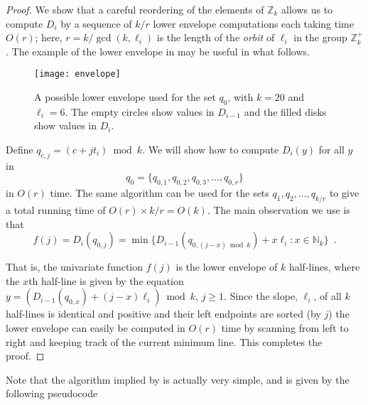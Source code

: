 \documentclass[11pt,a4paper]{article}
\newcommand{\Z}{\mathbb{Z}}
\newcommand{\N}{\mathbb{N}}
\newcommand{\defeq}{=}
\begin{document}
\begin{proof}
We show that a careful reordering of the elements of $\Z_k$ allows us
to compute $D_i$ by a sequence of $k/r$ lower envelope computations
each taking time $O(r)$; here, $r=k/\gcd(k,\ell_i)$ is the length of
the \emph{orbit} of $\ell_i$ in the group $\mathbb{Z}_k^+$.  The
example of 
the lower envelope in
 may be useful in what follows.

\begin{figure}
\begin{center}
\texttt{[image: envelope]}
\end{center}
\caption{A possible lower envelope used for the set $q_{0}$, with $k=20$
and $\ell_i=6$.   The empty circles show values in $D_{i-1}$ and
the filled disks show values in $D_i$.}
\end{figure}

Define $q_{c,j} = (c + jt_i)\bmod k$.  We will show how to compute
$D_{i}(y)$ for all $y$ in 
\[ 
    q_{0}=\{q_{0,1}, q_{0,2},q_{0,3},\ldots,q_{0,r}\}
\]
in $O(r)$ time.  The same algorithm can be used for the sets $q_{1},
q_{2}, \ldots, q_{k/r}$ to give a total running time of
$O(r)\times k/r= O(k)$.
The main observation we use is that
\begin{equation}
    f(j) \defeq D_{i}(q_{0,j}) = \min\{D_{i-1}(q_{0,(j-x)\bmod k})+x\ell_i :
x\in \N_k\} \enspace .
\end{equation}

That is, the univariate function $f(j)$ is the lower
envelope of $k$ half-lines, where the $x$th half-line is given by the
equation $y=(D_{i-1}(q_{0,x}) + (j-x)\ell_i)\bmod k$, $j\ge 1$.  Since
the slope, $\ell_i$, of all $k$ half-lines is identical and positive and
their left endpoints are sorted (by $j$) the lower envelope can easily
be computed in $O(r)$ time by scanning from left to right and keeping
track of the current minimum line.  This completes the proof.
\end{proof}

Note that the algorithm implied by  is actually very
simple, and is given by the following pseudocode

\begin{algorithmic}[1]
  \ENDFOR
  \ENDFOR
\ENDFOR
\end{algorithmic}
\end{document}
